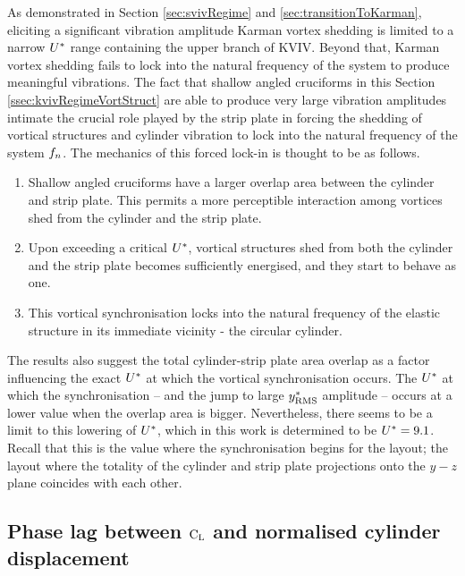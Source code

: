 \documentclass[oneside]{utmthesis}
\begin{document}
As demonstrated in Section \ref{sec:svivRegime} and \ref{sec:transitionToKarman}, eliciting a significant vibration amplitude Karman vortex shedding is limited to a narrow $U^{*}$ range containing the upper branch of KVIV. Beyond that, Karman vortex shedding fails to lock into the natural frequency of the system to produce meaningful vibrations. The fact that shallow angled cruciforms in this Section \ref{ssec:kvivRegimeVortStruct} are able to produce very large vibration amplitudes intimate the crucial role played by the strip plate in forcing the shedding of vortical structures and cylinder vibration to lock into the natural frequency of the system $f_{n}$. The mechanics of this forced lock-in is thought to be as follows.

\begin{enumerate}
  \item Shallow angled cruciforms have a larger overlap area between the cylinder and strip plate. This permits a more perceptible interaction among vortices shed from the cylinder and the strip plate.
  \item Upon exceeding a critical $U^{*}$, vortical structures shed from both the cylinder and the strip plate becomes sufficiently energised, and they start to behave as one.
  \item This vortical synchronisation locks into the natural frequency of the elastic structure in its immediate vicinity - the circular cylinder.
\end{enumerate}

\noindent The results also suggest the total cylinder-strip plate area overlap as a factor influencing the exact $U^{*}$ at which the vortical synchronisation occurs. The $U^{*}$ at which the synchronisation -- and the jump to large $y^{*}_{\text{RMS}}$ amplitude -- occurs at a lower value when the overlap area is bigger. Nevertheless, there seems to be a limit to this lowering of $U^{*}$, which in this work is determined to be $U^{*} = 9.1$. Recall that this is the value where the synchronisation begins for the \angon{} layout; the layout where the totality of the cylinder and strip plate projections onto the $y-z$ plane coincides with each other.

\subsection{Phase lag between $\text{C}_{\text{L}}$ and normalised cylinder displacement} \label{ssec:phaseLag22500}
\end{document}

